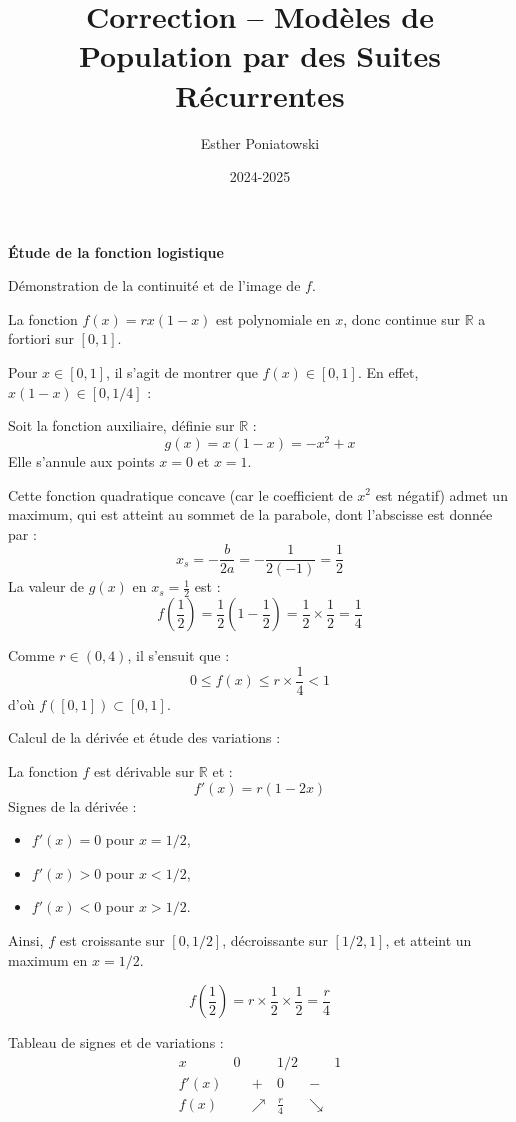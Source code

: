 \documentclass[10pt,a4paper]{article}
\title{Correction -- Modèles de Population par des Suites Récurrentes}
\author{Esther Poniatowski}
\date{2024-2025}
\begin{document}
\bigskip
\textbf{Étude de la fonction logistique}

\q Démonstration de la continuité et de l'image de \( f \).

La fonction \( f(x) = r x (1 - x) \) est polynomiale en \( x \), donc continue sur \( \mathbb{R} \)
a fortiori sur \( [0,1] \).

Pour \( x \in [0,1] \), il s'agit de montrer que \( f(x) \in [0,1] \). En effet, \( x(1 - x) \in
[0,1/4] \) :

Soit la fonction auxiliaire, définie sur \( \mathbb{R} \) :
\[
g(x) = x(1 - x) = -x^2 + x
\]
Elle s'annule aux points \( x = 0 \) et \( x = 1 \).

Cette fonction quadratique concave (car le coefficient de \( x^2 \) est négatif) admet un maximum,
qui est atteint au sommet de la parabole, dont l'abscisse est donnée par :
\[
x_s = -\frac{b}{2a} = -\frac{1}{2(-1)} = \frac{1}{2}
\]
La valeur de \( g(x) \) en \( x_s = \frac{1}{2} \) est :
\[
f\left(\frac{1}{2}\right) = \frac{1}{2} \left(1 - \frac{1}{2} \right) = \frac{1}{2} \times \frac{1}{2} = \frac{1}{4}
\]

Comme \( r \in (0,4) \), il s'ensuit que :
\[
0 \leq f(x) \leq r \times \frac{1}{4} < 1
\]
d'où \( f([0,1]) \subset [0,1] \).


\q Calcul de la dérivée et étude des variations :

La fonction \( f \) est dérivable sur \( \mathbb{R} \) et :
\[
f'(x) = r (1 - 2x)
\]
Signes de la dérivée :
\begin{itemize}
    \item \( f'(x) = 0 \) pour \( x = 1/2 \),
    \item \( f'(x) > 0 \) pour \( x < 1/2 \),
    \item \( f'(x) < 0 \) pour \( x > 1/2 \).
\end{itemize}

Ainsi, \( f \) est croissante sur \( [0,1/2] \),
décroissante sur \( [1/2, 1] \), et atteint un maximum en \( x = 1/2 \).

\[
f\left( \frac{1}{2} \right) = r \times \frac{1}{2} \times \frac{1}{2} = \frac{r}{4}
\]

Tableau de signes et de variations :
\[
\begin{array}{c|ccccc}
x & 0 &  & 1/2 &  & 1 \\
\hline
f'(x) &  & + & 0 & - &  \\
\hline
f(x) & & \nearrow & \frac{r}{4} & \searrow &
\end{array}
\]
\end{document}
